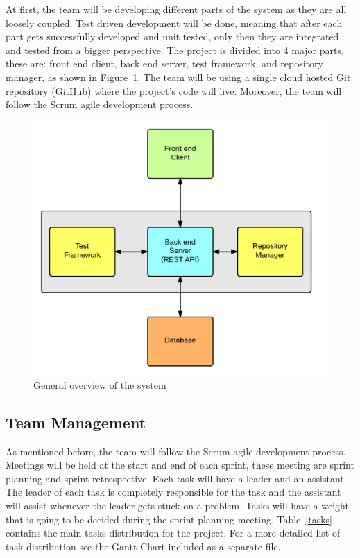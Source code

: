 
At first, the team will be developing different parts of
the system as they are all loosely coupled. Test driven development will be
done, meaning that after each part gets successfully developed and unit tested,
only then they are integrated and tested from a bigger perspective. The project
is divided into 4 major parts, these are: front end client, back end server,
test framework, and repository manager, as shown in Figure~\ref{arqu}. The team
will be using a single cloud hosted Git repository (GitHub) where the project's
code will live. Moreover, the
team will follow the Scrum agile development process.

\begin{figure}[H]
	\centering
	\includegraphics[scale=0.2]{img/bigArquitectOverview}
	\caption{General overview of the system\label{arqu}}
\end{figure}

\subsection{Team Management}

As mentioned before, the team will follow the Scrum agile development process.
Meetings will be held at the start and end of each sprint, these meeting are
sprint planning and sprint retrospective. Each task will have a leader and an
assistant. The leader of each task is completely responsible for the task and
the assistant will assist whenever the leader gets stuck on a problem. Tasks
will have a weight that is going to be decided during the sprint planning
meeting. Table~\ref{tasks} contains the main tasks distribution for the project.
For a more detailed list of task distribution see the Gantt Chart included as a
separate file.


